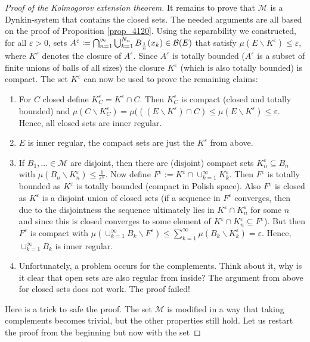 \begin{proof}[Proof of the Kolmogorov extension theorem]
	It remains to prove that $\mathcal M$ is a Dynkin-system that contains the closed sets. The needed arguments are all based on the proof of Proposition \ref{prop_4120}. Using the separability we constructed, for all $\varepsilon>0$, sets $A^\varepsilon \coloneqq \bigcap_{n=1}^{\infty} \bigcup_{k=1}^{N_n}B_{\frac{1}{n}}(x_k) \in\mathcal{B}(E)$ that satisfy $\mu(E\backslash K^\varepsilon)\leq \varepsilon$, where $K^\varepsilon$ denotes the closure of $A^\varepsilon$. Since $A^\varepsilon$ is totally bounded ($A^\varepsilon$ is a subset of finite unions of balls of all sizes) the closure $K^\varepsilon$ (which is also totally bounded) is compact. The set $K^\varepsilon$ can now be used to prove the remaining claims:
	\begin{enumerate}[label=(\roman*)]
		\item For $C$ closed define $K^\varepsilon_C=K^\varepsilon\cap C$. Then $K^\varepsilon_C$ is compact (closed and totally bounded) and $\mu(C\backslash K^\varepsilon_C)=\mu(((E\backslash K^\varepsilon)\cap C)\leq \mu(E\backslash K^\varepsilon)\leq \varepsilon$. Hence, all closed sets are inner regular.
		\item $E$ is inner regular, the compact sets are just the $K^\varepsilon$ from above.
  	\item If $B_1,...\in \mathcal M$ are disjoint, then there are (disjoint) compact sets $K^\varepsilon_n\subseteq B_n$ with $\mu(B_n\backslash K^\varepsilon_n)\leq \frac{1}{\varepsilon^n}$. Now define $F^\varepsilon:=K^\varepsilon\cap \cup_{k=1}^\infty K^\varepsilon_k$. Then $F^\varepsilon$ is totally bounded as $K^\varepsilon$ is totally bounded (compact in Polish space). Also $F^\varepsilon$ is closed as $K^\varepsilon$ is a disjoint union of closed sets (if a sequence in $F^\varepsilon$ converges, then due to the disjointness the sequence ultimately lies in $K^\varepsilon\cap K^\varepsilon_n$ for some $n$ and since this is closed converges to some element of $K^\varepsilon\cap K^\varepsilon_n\subseteq F^\varepsilon$). But then $F^\varepsilon$ is compact with $\mu(\cup_{k=1}^\infty B_k\backslash F^\varepsilon)\leq \sum_{k=1}^\infty \mu(B_k\backslash K^\varepsilon_k)=\varepsilon$. Hence, $\cup_{k=1}^\infty B_k$ is inner regular. 
   \item Unfortunately, a problem occurs for the complements. Think about it, why is it clear that open sets are also regular from inside? The argument from above for closed sets does not work. The proof failed!
	\end{enumerate}
	 Here is a trick to safe the proof. The set $\mathcal M$ is modified in a way that taking complements becomes trivial, but the other properties still hold. Let us restart the proof from the beginning but now with the set

\end{proof}
